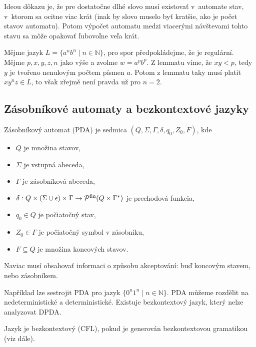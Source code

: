 Ideou dôkazu je, že pre dostatočne dlhé slovo musí existovať v~automate 
stav, v~ktorom sa ocitne viac krát (inak by slovo muselo byť kratšie,
ako je počet stavov automatu). Potom výpočet automatu medzi viacerými
návštevami tohto stavu sa môže opakovať ľubovoľne veľa krát.

\begin{example}
    Mějme jazyk $L = \{ a^n b^n \mid n \in \mathbb{N} \}$,
    pro spor předpokládejme, že je regulární.
    Mějme $p,x,y,z,n$ jako výše a zvolme $w = a^p b^p$.
    Z lemmatu víme, že $xy < p$, tedy $y$ je tvořeno nenulovým počtem
    písmen $a$.  Potom z lemmatu taky musí platit $xy^nz \in L$, to však
    zřejmě není pravda už pro $n = 2$.
\end{example}

\subsection{Zásobníkové automaty a bezkontextové jazyky}

\begin{definition}
    Zásobníkový automat (PDA) je sedmica $(Q, \Sigma, \Gamma, \delta, q_0, Z_0,F)$, kde
	\begin{itemize}
		\item $Q$ je množina stavov,
		\item $\Sigma$ je vstupná abeceda,
		\item $\Gamma$ je zásobníková abeceda,
		\item $\delta : Q \times (\Sigma \cup \epsilon) \times \Gamma \to \mathcal{P}^{\text{fin}}(Q \times \Gamma^*)$ je prechodová funkcia,
		\item $q_0 \in Q$ je počiatočný stav,
		\item $Z_0 \in \Gamma$ je počiatočný symbol v zásobníku,
		\item $F \subseteq Q$ je množina koncových stavov.
	\end{itemize}
    Naviac musí obsahovať informaci o způsobu akceptování: buď koncovým stavem, nebo
    zásobníkem.
\end{definition}

Například lze sestrojit PDA pro jazyk
$\{ 0^n 1^n \mid n \in \mathbb{N} \}$.
PDA můžeme rozdělit na nedeterministické a deterministické. Existuje
bezkontextový jazyk, který nelze analyzovat DPDA.

\begin{definition}
    Jazyk je bezkontextový (CFL), pokud je generován bezkontextovou
    gramatikou (viz dále).
\end{definition}

